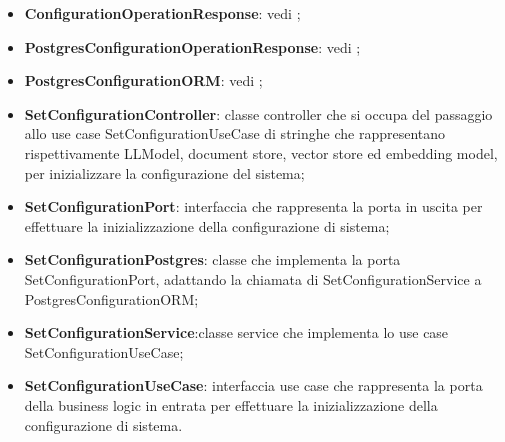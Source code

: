 \documentclass[10pt, a4paper]{article}
\begin{document}
\begin{itemize}
    \item \textbf{ConfigurationOperationResponse}: vedi ;
    \item \textbf{PostgresConfigurationOperationResponse}: vedi ;
    \item \textbf{PostgresConfigurationORM}: vedi ;
    
    \item \label{SetConfigurationController}\textbf{SetConfigurationController}: classe controller che si occupa del passaggio allo use case SetConfigurationUseCase di stringhe che rappresentano rispettivamente LLModel, document store, vector store ed embedding model, per inizializzare la configurazione del sistema;
    \item \label{SetConfigurationPort}\textbf{SetConfigurationPort}: interfaccia che rappresenta la porta in uscita per effettuare la inizializzazione della configurazione di sistema;
    \item \label{SetConfigurationPostgres}\textbf{SetConfigurationPostgres}:  classe che implementa la porta SetConfigurationPort, adattando la chiamata di SetConfigurationService a PostgresConfigurationORM;

    \item \label{SetConfigurationService}\textbf{SetConfigurationService}:classe service che implementa lo use case SetConfigurationUseCase;
    \item \label{SetConfigurationUseCase}\textbf{SetConfigurationUseCase}: interfaccia use case che rappresenta la porta della business logic in entrata per effettuare la inizializzazione della configurazione di sistema.


\end{itemize}
\end{document}
